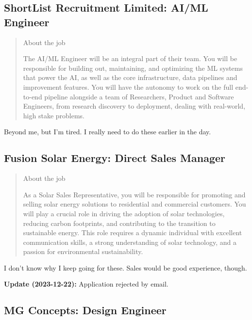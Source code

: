 \documentclass[
	letterpaper, %
	12pt, %
]{CSSullivanBusinessReport}
\begin{document}

\subsection[ShortList Recruitment Limited]{ShortList Recruitment Limited: AI/ML Engineer}

\begin{quote}
	About the job
	
	The AI/ML Engineer will be an integral part of their team. You will be responsible for building out, maintaining, and optimizing the ML systems that power the AI, as well as the core infrastructure, data pipelines and improvement features. You will have the autonomy to work on the full end-to-end pipeline alongside a team of Researchers, Product and Software Engineers, from research discovery to deployment, dealing with real-world, high stake problems. 

\end{quote}

Beyond me, but I'm tired. I really need to do these earlier in the day.



\subsection[Fusion Solar Energy]{Fusion Solar Energy: Direct Sales Manager}

\begin{quote}
	About the job
	
	As a Solar Sales Representative, you will be responsible for promoting and selling solar energy solutions to residential and commercial customers. You will play a crucial role in driving the adoption of solar technologies, reducing carbon footprints, and contributing to the transition to sustainable energy. This role requires a dynamic individual with excellent communication skills, a strong understanding of solar technology, and a passion for environmental sustainability.

\end{quote}

I don't know why I keep going for these. Sales would be good experience, though.

\textbf{Update (2023-12-22):} Application rejected by email. 


\subsection[MG Concepts]{MG Concepts: Design Engineer}
\end{document}
